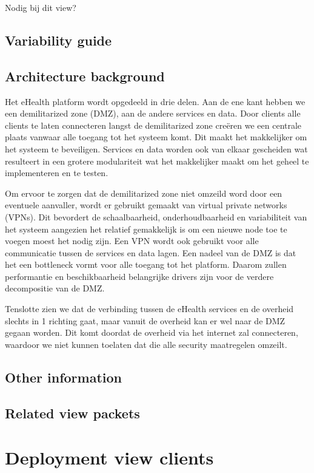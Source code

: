 \documentclass[a4paper,10pt]{paper}
\begin{document}
Nodig bij dit view?

\subsection{Variability guide}

\subsection{Architecture background}

Het eHealth platform wordt opgedeeld in drie delen. Aan de ene kant hebben we een demilitarized zone (DMZ), aan de andere services en data. Door clients alle clients te laten connecteren langst de demilitarized zone creëren we een centrale plaats vanwaar alle toegang tot het systeem komt. Dit maakt het makkelijker om het systeem te beveiligen. Services en data worden ook van elkaar gescheiden wat resulteert in een grotere modulariteit wat het makkelijker maakt om het geheel te implementeren en te testen.

Om ervoor te zorgen dat de demilitarized zone niet omzeild word door een eventuele aanvaller, wordt er gebruikt gemaakt van virtual private networks (VPNs). Dit bevordert de schaalbaarheid, onderhoudbaarheid en variabiliteit van het systeem aangezien het relatief gemakkelijk is om een nieuwe node toe te voegen moest het nodig zijn. Een VPN wordt ook gebruikt voor alle communicatie tussen de services en data lagen. Een nadeel van de DMZ is dat het een bottleneck vormt voor alle toegang tot het platform. Daarom zullen performantie en beschikbaarheid belangrijke drivers zijn voor de verdere decompositie van de DMZ.

Tenslotte zien we dat de verbinding tussen de eHealth services en de overheid slechts in 1 richting gaat, maar vanuit de overheid kan er wel naar de DMZ gegaan worden. Dit komt doordat de overheid via het internet zal connecteren, waardoor we niet kunnen toelaten dat die alle security maatregelen omzeilt.

\subsection{Other information}

\subsection{Related view packets}


\section{Deployment view clients}
\end{document}
